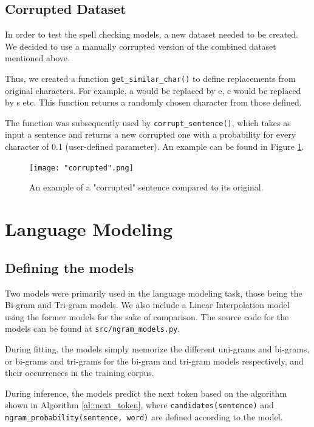 \documentclass[11pt, a4paper]{article}
\begin{document}
	
	
	

	\subsection{Corrupted Dataset}
	
	In order to test the spell checking models, a new dataset needed to be created. We decided to use a manually corrupted version of the combined dataset mentioned above.
	
	Thus, we created a function \texttt{get\_similar\_char()} to define replacements from original characters. For example, a would be replaced by e, c would be replaced by s etc. This function returns a randomly chosen character from those defined.
	
	The function was subsequently used by \texttt{corrupt\_sentence()}, which takes as input a sentence and returns a new corrupted one with a probability for every character of 0.1 (user-defined parameter). An example can be found in Figure \ref{fig::corruption}.
 
	\begin{figure}
	    \centering
	    \texttt{[image: "corrupted".png]}
	    \caption{An example of a "corrupted" sentence compared to its original.}
    \label{fig::corruption}
	\end{figure}
		
	
	\section{Language Modeling}
	
	\subsection{Defining the models}
	
	Two models were primarily used in the language modeling task, those being the Bi-gram and Tri-gram models. We also include a Linear Interpolation model using the former models for the sake of comparison. The source code for the models can be found at \texttt{src/ngram\_models.py}.
	
	During fitting, the models simply memorize the different uni-grams and bi-grams, or bi-grams and tri-grams for the bi-gram and tri-gram models respectively, and their occurrences in the training corpus. 
	
	During inference, the models predict the next token based on the algorithm shown in Algorithm \ref{al::next_token}, where \texttt{candidates(sentence)} and \texttt{ngram\_probability(sentence, word)} are defined according to the model. 
	
\end{document}
